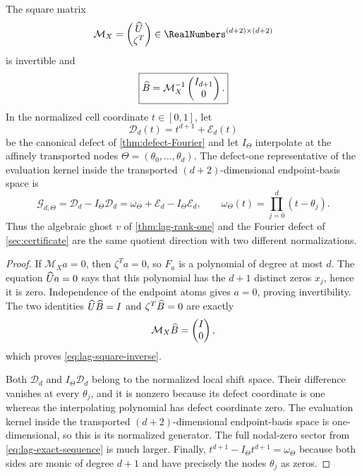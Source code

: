\begin{corollary}
\label{cor:lag-square-completion}
The square matrix
\begin{equation}
 \mathcal M_X=
 \begin{pmatrix}\AugmentedEvaluationMatrix\\ \zeta^T\end{pmatrix}
 \in\RealNumbers^{(d+2)\times(d+2)}
 \label{eq:lag-square-completion}
\end{equation}
is invertible and
\begin{equation}
 \boxed{\widehat B=\mathcal M_X^{-1}
 \begin{pmatrix}I_{d+1}\\0\end{pmatrix}.}
 \label{eq:lag-square-inverse}
\end{equation}
In the normalized cell coordinate $t\in[0,1]$, let
\[
 \mathcal D_d(t)=t^{d+1}+\mathcal E_d(t)
\]
be the canonical defect of \cref{thm:defect-Fourier} and let $I_\Theta$ interpolate at
the affinely transported nodes $\Theta=(\theta_0,\ldots,\theta_d)$.  The
 defect-one representative of the evaluation kernel inside the transported
 $(d+2)$-dimensional endpoint-basis space is
\begin{equation}
 \boxed{\mathcal G_{d,\Theta}
 =\mathcal D_d-I_\Theta\mathcal D_d
 =\omega_\Theta+\mathcal E_d-I_\Theta\mathcal E_d,}
 \qquad
 \omega_\Theta(t)=\prod_{j=0}^{d}(t-\theta_j).
 \label{eq:lag-canonical-ghost}
\end{equation}
Thus the algebraic ghost $v$ of \cref{thm:lag-rank-one} and the Fourier defect
of \cref{sec:certificate} are the same quotient direction with two different
normalizations.
\end{corollary}

\begin{proof}
If $\mathcal M_Xa=0$, then $\zeta^Ta=0$, so $F_a$ is a polynomial of degree
at most $d$.  The equation $\widehat U a=0$ says that this polynomial has the
$d+1$ distinct zeros $x_j$, hence it is zero.  Independence of the endpoint
atoms gives $a=0$, proving invertibility.  The two identities
$\widehat U\widehat B=I$ and $\zeta^T\widehat B=0$ are exactly
\[
 \mathcal M_X\widehat B=\begin{pmatrix}I\\0\end{pmatrix},
\]
which proves \eqref{eq:lag-square-inverse}.

Both $\mathcal D_d$ and $I_\Theta\mathcal D_d$ belong to the normalized local
shift space.  Their difference vanishes at every $\theta_j$, and it is
nonzero because its defect coordinate is one whereas the interpolating
polynomial has defect coordinate zero.  The evaluation kernel inside the
transported $(d+2)$-dimensional endpoint-basis space is one-dimensional, so
this is its normalized generator.  The full nodal-zero sector from
\eqref{eq:lag-exact-sequence} is much larger.  Finally,
$t^{d+1}-I_\Theta t^{d+1}=\omega_\Theta$ because both sides are monic of
degree $d+1$ and have precisely the nodes $\theta_j$ as zeros.
\end{proof}

